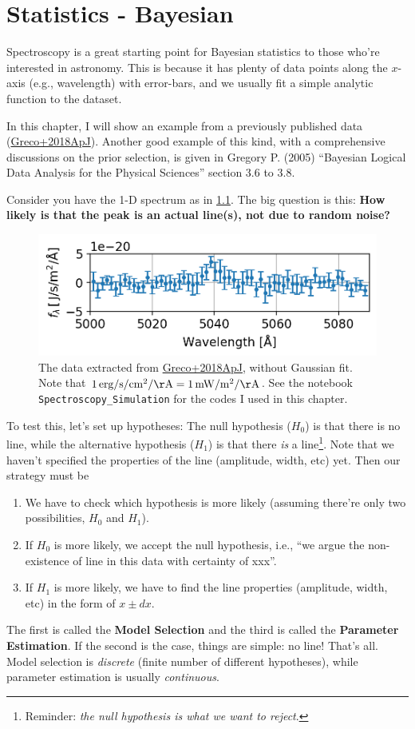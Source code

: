 \chapter{Statistics - Bayesian}

Spectroscopy is a great starting point for Bayesian statistics to those who're interested in astronomy. This is because it has plenty of data points along the $ x $-axis (e.g., wavelength) with error-bars, and we usually fit a simple analytic function to the dataset. 

In this chapter, I will show an example from a previously published data (\href{https://ui.adsabs.harvard.edu/abs/2018ApJ...866..112G/abstract}{Greco+2018ApJ}). Another good example of this kind, with a comprehensive discussions on the prior selection, is given in Gregory P. (2005) ``Bayesian Logical Data Analysis for the Physical Sciences'' section 3.6 to 3.8.

Consider you have the 1-D spectrum as in \cref{fig:greco2018f2-rep}. The big question is this: \textbf{How likely is that the peak is an actual line(s), not due to random noise?}
\begin{figure}[ht!]
  \centering
  \includegraphics[width=0.6\linewidth]{figs/Greco2018F2-rep}
  \caption{The data extracted from \href{https://ui.adsabs.harvard.edu/abs/2018ApJ...866..112G/abstract}{Greco+2018ApJ}, without Gaussian fit. Note that $ 1 \,\mathrm{erg/s/cm^2/\AA} = 1 \, \mathrm{mW/m^2/\AA} $. See the notebook \texttt{Spectroscopy\_Simulation} for the codes I used in this chapter.}
  \label{fig:greco2018f2-rep}
\end{figure}


To test this, let's set up hypotheses: The null hypothesis ($H_0$) is that there is no line, while the alternative hypothesis ($H_1$) is that there \textit{is} a line\footnote{Reminder: \textit{the null hypothesis is what we want to reject}.}. Note that we haven't specified the properties of the line (amplitude, width, etc) yet. Then our strategy must be
\begin{enumerate}
\item We have to check which hypothesis is more likely (assuming there're only two possibilities, $ H_0 $ and $ H_1 $).
\item If $H_0$ is more likely, we accept the null hypothesis, i.e., ``we argue the non-existence of line in this data with certainty of xxx''.
\item If $H_1$ is more likely, we have to find the line properties (amplitude, width, etc) in the form of $ x \pm dx $.
\end{enumerate}
The first is called the \textbf{Model Selection} and the third is called the \textbf{Parameter Estimation}. If the second is the case, things are simple: no line! That's all. Model selection is \textit{discrete} (finite number of different hypotheses), while parameter estimation is usually \textit{continuous}.

